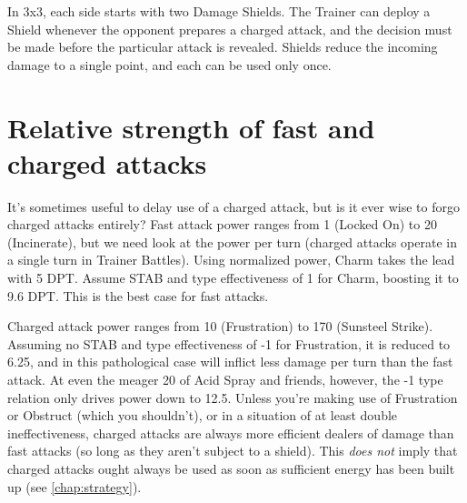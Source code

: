 In 3x3, each side starts with two Damage Shields.
The Trainer can deploy a Shield whenever the opponent prepares a charged attack,
   and the decision must be made before the particular attack is revealed.
Shields reduce the incoming damage to a single point, and each can be used only once.

\section{Relative strength of fast and charged attacks}
It's sometimes useful to delay use of a charged attack, but is it ever wise to forgo
  charged attacks entirely?
Fast attack power ranges from 1 (Locked On) to 20 (Incinerate), but we need look at
  the power per turn (charged attacks operate in a single turn in Trainer Battles).
Using normalized power, Charm takes the lead with 5 DPT\@.
Assume STAB and type effectiveness of 1 for Charm, boosting it to 9.6 DPT\@.
This is the best case for fast attacks.

Charged attack power ranges from 10 (Frustration) to 170 (Sunsteel Strike).
Assuming no STAB and type effectiveness of -1 for Frustration, it is reduced to 6.25,
  and in this pathological case will inflict less damage per turn than the fast attack.
At even the meager 20 of Acid Spray and friends, however, the -1 type relation only
  drives power down to 12.5.
Unless you're making use of Frustration or Obstruct (which you shouldn't),
  or in a situation of at least double ineffectiveness, charged attacks are
  always more efficient dealers of damage than fast attacks (so long
  as they aren't subject to a shield).
This \textit{does not} imply that charged attacks ought always be used as soon as
  sufficient energy has been built up (see \autoref{chap:strategy}).
